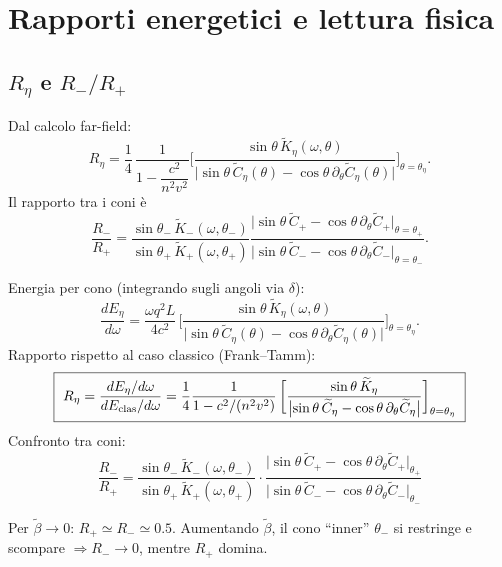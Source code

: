 \documentclass[11pt,a4paper]{article}
\newcommand{\wt}[1]{\widetilde{#1}}
\newcommand{\vv}{v}
\newcommand{\cc}{c}
\newcommand{\nn}{n}
\newcommand{\om}{\omega}
\newcommand{\w}{\omega}
\newcommand{\Ct}{\wt{C}}
\newcommand{\Kt}{\wt{K}}
\newcommand{\betat}{\wt{\beta}} %
\begin{document}
\section{Rapporti energetici e lettura fisica}
\subsection{\texorpdfstring{$R_\eta$ e $R_-/R_+$}{R\_eta e R\_-/R\_+}}
Dal calcolo far-field:
\begin{equation}
R_{\eta}=\frac{1}{4}\,\frac{1}{1-\dfrac{\cc^{2}}{\nn^{2}\vv^{2}}}
\Biggl[\frac{\sin\theta\,\Kt_{\eta}(\w,\theta)}{\bigl|\sin\theta\,\Ct_{\eta}(\theta)-\cos\theta\,\partial_{\theta}\Ct_{\eta}(\theta)\bigr|}\Biggr]_{\theta=\theta_{\eta}}.
\end{equation}
Il rapporto tra i coni è
\begin{equation}
\frac{R_{-}}{R_{+}}=\frac{\sin\theta_{-}\,\Kt_{-}(\w,\theta_{-})}{\sin\theta_{+}\,\Kt_{+}(\w,\theta_{+})}
\frac{\bigl|\sin\theta\,\Ct_{+}-\cos\theta\,\partial_{\theta}\Ct_{+}\bigr|_{\theta=\theta_{+}}}{\bigl|\sin\theta\,\Ct_{-}-\cos\theta\,\partial_{\theta}\Ct_{-}\bigr|_{\theta=\theta_{-}}}.
\end{equation}

Energia per cono (integrando sugli angoli via $\delta$):
\begin{equation}
\frac{dE_\eta}{d\om}=\frac{\om q^2 L}{4\cc^2}\,
\biggl[\frac{\sin\theta\,\Kt_\eta(\om,\theta)}
{\bigl|\sin\theta\,\Ct_\eta(\theta)-\cos\theta\,\partial_\theta \Ct_\eta(\theta)\bigr|}\biggr]_{\theta=\theta_\eta}.
\end{equation}
Rapporto rispetto al caso classico (Frank--Tamm):
\begin{equation}
\boxed{\ R_\eta=\frac{dE_\eta/d\om}{dE_{\rm clas}/d\om}
=\frac{1}{4}\frac{1}{1-\cc^2/(\nn^2\vv^2)}\,
\biggl[\frac{\sin\theta\,\Kt_\eta}{\bigl|\sin\theta\,\Ct_\eta-\cos\theta\,\partial_\theta \Ct_\eta\bigr|}\biggr]_{\theta=\theta_\eta}\ }
\end{equation}
Confronto tra coni:
\begin{equation}
\boxed{\ \frac{R_-}{R_+}
=\frac{\sin\theta_-\,\Kt_-(\om,\theta_-)}{\sin\theta_+\,\Kt_+(\om,\theta_+)}
\cdot
\frac{\bigl|\sin\theta\,\Ct_+ - \cos\theta\,\partial_\theta\Ct_+\bigr|_{\theta_+}}
{\bigl|\sin\theta\,\Ct_- - \cos\theta\,\partial_\theta\Ct_-\bigr|_{\theta_-}}\ }
\end{equation}

Per $\betat\to 0$: $R_+\simeq R_-\simeq 0.5$. Aumentando $\betat$, il cono ``inner'' $\theta_-$ si restringe e scompare $\Rightarrow R_-\to 0$, mentre $R_+$ domina.
\end{document}
